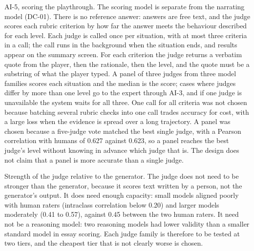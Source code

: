 AI-5, scoring the playthrough. The scoring model is separate from the narrating model (DC-01). There is no reference answer: answers are free text, and the judge scores each rubric criterion by how far the answer meets the behaviour described for each level. Each judge is called once per situation, with at most three criteria in a call; the call runs in the background when the situation ends, and results appear on the summary screen. For each criterion the judge returns a verbatim quote from the player, then the rationale, then the level, and the quote must be a substring of what the player typed. A panel of three judges from three model families scores each situation and the median is the score; cases where judges differ by more than one level go to the expert through AI-3, and if one judge is unavailable the system waits for all three. One call for all criteria was not chosen because batching several rubric checks into one call trades accuracy for cost, with a large loss when the evidence is spread over a long trajectory\cite{r123}. A panel was chosen because a five-judge vote matched the best single judge, with a Pearson correlation with humans of 0.627 against 0.623\cite{r124}, so a panel reaches the best judge's level without knowing in advance which judge that is. The design does not claim that a panel is more accurate than a single judge.

Strength of the judge relative to the generator. The judge does not need to be stronger than the generator, because it scores text written by a person, not the generator's output. It does need enough capacity: small models aligned poorly with human raters (intraclass correlation below 0.20) and larger models moderately (0.41 to 0.57), against 0.45 between the two human raters\cite{r125}. It need not be a reasoning model: two reasoning models had lower validity than a smaller standard model in essay scoring\cite{r126}. Each judge family is therefore to be tested at two tiers, and the cheapest tier that is not clearly worse is chosen.

